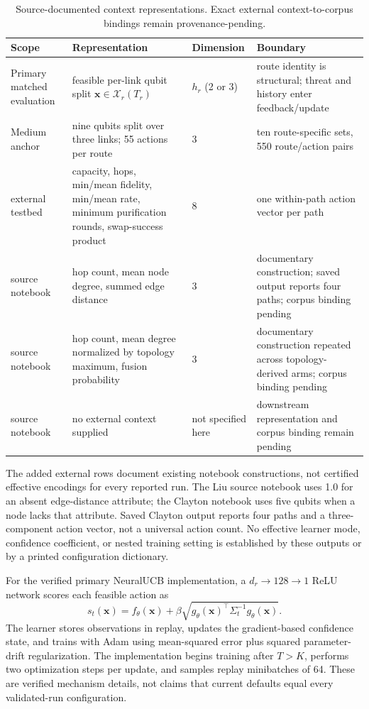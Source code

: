 \begin{table}[t]
\centering\footnotesize
\setlength{\tabcolsep}{2pt}
\caption{Source-documented context representations. Exact external context-to-corpus bindings remain provenance-pending.}
\label{tab:context_representation}
\begin{tabular}{p{}p{}p{}p{}}
\toprule
\textbf{Scope} & \textbf{Representation} & \textbf{Dimension} & \textbf{Boundary}\\
\midrule
Primary matched evaluation & feasible per-link qubit split $\mathbf{x}\in\mathcal{X}_r(T_r)$ & $h_r$ (2 or 3) & route identity is structural; threat and history enter feedback/update\\
Medium anchor & nine qubits split over three links; 55 actions per route & 3 & ten route-specific sets, 550 route/action pairs\\
\paperEight{} external testbed & capacity, hops, min/mean fidelity, min/mean rate, minimum purification rounds, swap-success product & 8 & one within-path action vector per path\\
\paperSeven{} source notebook & hop count, mean node degree, summed edge distance & 3 & documentary construction; saved output reports four paths; corpus binding pending\\
\paperTwelve{} source notebook & hop count, mean degree normalized by topology maximum, fusion probability & 3 & documentary construction repeated across topology-derived arms; corpus binding pending\\
\paperTwo{} source notebook & no external context supplied & not specified here & downstream representation and corpus binding remain pending\\
\bottomrule
\end{tabular}
\end{table}

The added external rows document existing notebook constructions, not certified effective encodings for every reported run. The Liu source notebook uses 1.0 for an absent edge-distance attribute; the Clayton notebook uses five qubits when a node lacks that attribute. Saved Clayton output reports four paths and a three-component action vector, not a universal action count. No effective learner mode, confidence coefficient, or nested training setting is established by these outputs or by a printed configuration dictionary.

For the verified primary NeuralUCB implementation, a $d_r\!\to\!128\!\to\!1$ ReLU network scores each feasible action as
\[
s_t(\mathbf{x})=f_\theta(\mathbf{x})+\beta\sqrt{g_\theta(\mathbf{x})^\top\Sigma_t^{-1}g_\theta(\mathbf{x})}.
\]
The learner stores observations in replay, updates the gradient-based confidence state, and trains with Adam using mean-squared error plus squared parameter-drift regularization. The implementation begins training after $T>K$, performs two optimization steps per update, and samples replay minibatches of 64. These are verified mechanism details, not claims that current defaults equal every validated-run configuration.

